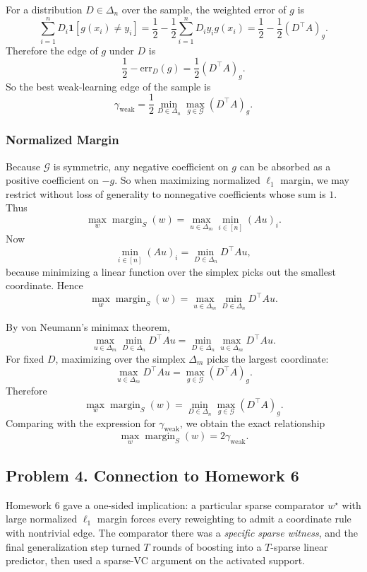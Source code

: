 \documentclass{article}
\newcommand{\cG}{\mathcal{G}}
\newcommand{\one}{\mathbf{1}}
\begin{document}
For a distribution $D\in\Delta_n$ over the sample, the weighted error of $g$ is
$$
\sum_{i=1}^n D_i \one[g(x_i)\ne y_i]
=
\frac12-\frac12\sum_{i=1}^n D_i y_i g(x_i)
=
\frac12-\frac12 (D^\top A)_g.
$$
Therefore the edge of $g$ under $D$ is
$$
\frac12-\text{err}_D(g)
=
\frac12(D^\top A)_g.
$$
So the best weak-learning edge of the sample is
$$
\gamma_{\mathrm{weak}}
=
\frac12 \min_{D\in\Delta_n}\max_{g\in\cG}(D^\top A)_g.
$$

\subsubsection{Normalized Margin}

Because $\cG$ is symmetric, any negative coefficient on $g$ can be absorbed as a positive coefficient on $-g$. So when maximizing normalized $\ell_1$ margin, we may restrict without loss of generality to nonnegative coefficients whose sum is $1$. Thus
$$
\max_w \operatorname{margin}_S(w)
=
\max_{u\in\Delta_m} \min_{i\in[n]} (Au)_i.
$$
Now
$$
\min_{i\in[n]} (Au)_i
=
\min_{D\in\Delta_n} D^\top A u,
$$
because minimizing a linear function over the simplex picks out the smallest coordinate. Hence
$$
\max_w \operatorname{margin}_S(w)
=
\max_{u\in\Delta_m} \min_{D\in\Delta_n} D^\top A u.
$$

By von Neumann's minimax theorem,
$$
\max_{u\in\Delta_m} \min_{D\in\Delta_n} D^\top A u
=
\min_{D\in\Delta_n} \max_{u\in\Delta_m} D^\top A u.
$$
For fixed $D$, maximizing over the simplex $\Delta_m$ picks the largest coordinate:
$$
\max_{u\in\Delta_m} D^\top A u
=
\max_{g\in\cG} (D^\top A)_g.
$$
Therefore
$$
\max_w \operatorname{margin}_S(w)
=
\min_{D\in\Delta_n}\max_{g\in\cG}(D^\top A)_g.
$$
Comparing with the expression for $\gamma_{\mathrm{weak}}$, we obtain the exact relationship
$$
\max_w \operatorname{margin}_S(w)
=
2\gamma_{\mathrm{weak}}.
$$

\subsection{Problem 4. Connection to Homework 6}

Homework 6 gave a one-sided implication:
a particular sparse comparator $w^\star$ with large normalized $\ell_1$ margin forces every reweighting to admit a coordinate rule with nontrivial edge. The comparator there was a \emph{specific sparse witness}, and the final generalization step turned $T$ rounds of boosting into a $T$-sparse linear predictor, then used a sparse-VC argument on the activated support.
\end{document}
